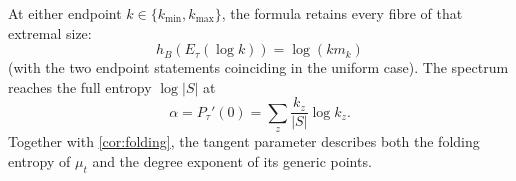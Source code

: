 At either endpoint $k\in\{k_{\min},k_{\max}\}$, the formula retains every
fibre of that extremal size:
\[
 h_B(E_\tau(\log k))=\log(km_k)
\]
(with the two endpoint statements coinciding in the uniform case).  The
spectrum reaches the full entropy $\log|S|$ at
\[
 \alpha=P_\tau'(0)=\sum_z\frac{k_z}{|S|}\log k_z.
\]
Together with \cref{cor:folding}, the tangent parameter describes both the
folding entropy of $\mu_t$ and the degree exponent of its generic points.

